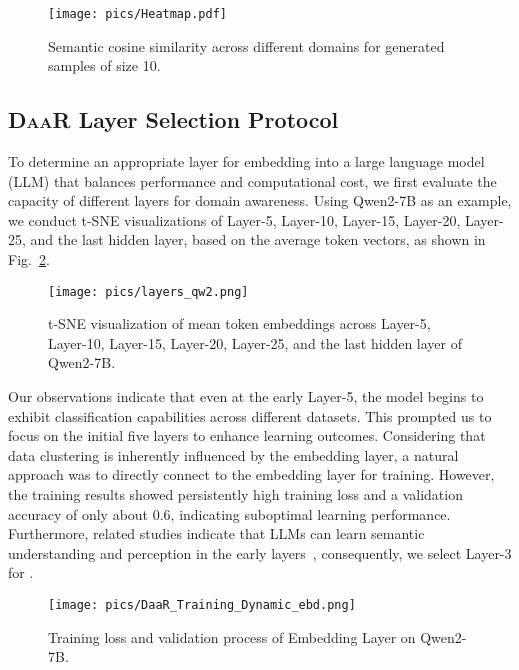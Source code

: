 \begin{figure}[h]
\centering
\texttt{[image: pics/Heatmap.pdf]}
\caption{Semantic cosine similarity across different domains for generated samples of size 10.}
\label{fig:heatmap}
\end{figure}

\subsection{\textsc{DaaR} Layer Selection Protocol}
\label{sec:layer-selection}

To determine an appropriate layer for embedding \ours into a large language model (LLM) that balances performance and computational cost, we first evaluate the capacity of different layers for domain awareness. Using Qwen2-7B as an example, we conduct t-SNE visualizations of Layer-5, Layer-10, Layer-15, Layer-20, Layer-25, and the last hidden layer, based on the average token vectors, as shown in Fig.~\ref{fig:layers}.

\begin{figure}[h]
\centering
\texttt{[image: pics/layers\_qw2.png]}
\vspace{-0.8cm}
\caption{t-SNE visualization of mean token embeddings across Layer-5, Layer-10, Layer-15, Layer-20, Layer-25, and the last hidden layer of Qwen2-7B.}
\label{fig:layers}
\end{figure}

Our observations indicate that even at the early Layer-5, the model begins to exhibit classification capabilities across different datasets. This prompted us to focus on the initial five layers to enhance learning outcomes. Considering that data clustering is inherently influenced by the embedding layer, a natural approach was to directly connect to the embedding layer for training. However, the training results showed persistently high training loss and a validation accuracy of only about 0.6, indicating suboptimal learning performance. Furthermore, related studies indicate that LLMs can learn semantic understanding and perception in the early layers~\cite{wei2022emergent}, consequently, we select Layer-3 for \ours.

\begin{figure}[h]
\centering
\texttt{[image: pics/DaaR\_Training\_Dynamic\_ebd.png]}
\vspace{-0.4cm}
\caption{Training loss and validation process of Embedding Layer on Qwen2-7B.}
\end{figure}

